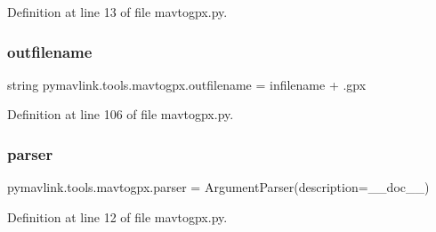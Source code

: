 Definition at line 13 of file mavtogpx.\+py.

\mbox{\label{namespacepymavlink_1_1tools_1_1mavtogpx_a4916c147b615073bbdb8b018d8dab198}} 
\subsubsection{\texorpdfstring{outfilename}{outfilename}}
{\footnotesize\ttfamily string pymavlink.\+tools.\+mavtogpx.\+outfilename = infilename + \textquotesingle{}.gpx\textquotesingle{}}



Definition at line 106 of file mavtogpx.\+py.

\mbox{\label{namespacepymavlink_1_1tools_1_1mavtogpx_aee884cdb38da103bca5341f48d1d015b}} 
\subsubsection{\texorpdfstring{parser}{parser}}
{\footnotesize\ttfamily pymavlink.\+tools.\+mavtogpx.\+parser = Argument\+Parser(description=\+\_\+\+\_\+doc\+\_\+\+\_\+)}



Definition at line 12 of file mavtogpx.\+py.

